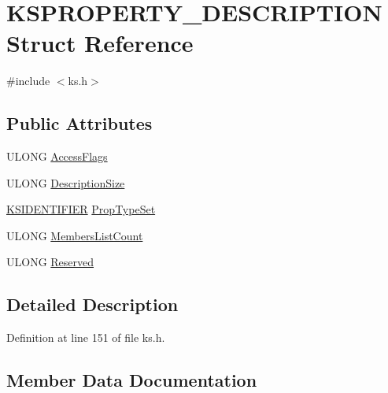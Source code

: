 \hypertarget{struct_k_s_p_r_o_p_e_r_t_y___d_e_s_c_r_i_p_t_i_o_n}{}\section{K\+S\+P\+R\+O\+P\+E\+R\+T\+Y\+\_\+\+D\+E\+S\+C\+R\+I\+P\+T\+I\+ON Struct Reference}
\label{struct_k_s_p_r_o_p_e_r_t_y___d_e_s_c_r_i_p_t_i_o_n}


{\ttfamily \#include $<$ks.\+h$>$}

\subsection*{Public Attributes}
\begin{DoxyCompactItemize}
\item 
U\+L\+O\+NG \hyperlink{struct_k_s_p_r_o_p_e_r_t_y___d_e_s_c_r_i_p_t_i_o_n_a9e931183967a877613638f1cb2b29eb6}{Access\+Flags}
\item 
U\+L\+O\+NG \hyperlink{struct_k_s_p_r_o_p_e_r_t_y___d_e_s_c_r_i_p_t_i_o_n_a500a1671b6931c3482b811f70ca84398}{Description\+Size}
\item 
\hyperlink{struct_k_s_i_d_e_n_t_i_f_i_e_r}{K\+S\+I\+D\+E\+N\+T\+I\+F\+I\+ER} \hyperlink{struct_k_s_p_r_o_p_e_r_t_y___d_e_s_c_r_i_p_t_i_o_n_a85872a0db90034b720592d555b15369a}{Prop\+Type\+Set}
\item 
U\+L\+O\+NG \hyperlink{struct_k_s_p_r_o_p_e_r_t_y___d_e_s_c_r_i_p_t_i_o_n_a8b8a6e033864e7ce5fe67ce6803c5e13}{Members\+List\+Count}
\item 
U\+L\+O\+NG \hyperlink{struct_k_s_p_r_o_p_e_r_t_y___d_e_s_c_r_i_p_t_i_o_n_ae4fe02efb0464f5b30255f6fd4ef2d45}{Reserved}
\end{DoxyCompactItemize}


\subsection{Detailed Description}


Definition at line 151 of file ks.\+h.



\subsection{Member Data Documentation}
